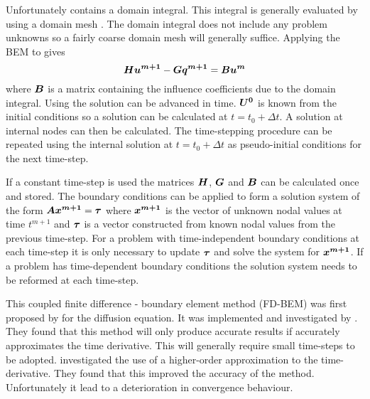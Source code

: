 Unfortunately  contains a domain integral.  This integral is
generally evaluated by using a domain mesh \cite{brebbia:1984}.  The domain
integral does not include any problem unknowns so a fairly coarse domain
mesh will generally suffice. Applying the BEM to  gives
\begin{equation}
\matr{H} \vect{u^{m+1}} - \matr{G} \vect{q^{m+1}} = \matr{B} \vect{u^{m}}
\label{eq:fdbemsys}
\end{equation}
where $\matr{B}$ is a matrix containing the influence coefficients due to the
domain integral.  Using  the solution
can be advanced in time.  $\matr{u^{0}}$ is known from the initial
conditions so a solution can be calculated at $t = t_{0} + \Delta t$.  A
solution at internal nodes can then be calculated.  The time-stepping
procedure can be repeated using the internal solution at  $t = t_{0} +
\Delta t$ as pseudo-initial conditions for the next time-step.  

If a constant time-step is used the matrices $\matr{H}$, $\matr{G}$ and
$\matr{B}$ can be calculated once and stored. The boundary conditions can be
applied to form a solution system of the form $\matr{A} \vect{x^{m+1}} =
\vect{\tau}$ where $\vect{x^{m+1}}$ is the vector of unknown nodal values
at time $t^{m+1}$ and $\vect{\tau}$ is a vector constructed from known
nodal values from the previous time-step.  For a problem with
time-independent boundary conditions at each time-step it is only necessary
to update $\vect{\tau}$ and solve the system for $\vect{x^{m+1}}$.  If a
problem has time-dependent boundary conditions the solution system needs to
be reformed at each time-step.

This coupled finite difference - boundary element method (FD-BEM) was first
proposed by  for the diffusion equation. It was
implemented and investigated by .  They found that
this method will only produce accurate results if 
accurately approximates the time derivative.  This will generally require
small time-steps to be adopted.   investigated the use
of a higher-order approximation to the time-derivative.  They found that
this improved the accuracy of the method.  Unfortunately it lead to a
deterioration in convergence behaviour.

